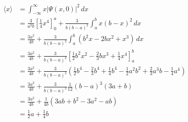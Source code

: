 \documentclass{article}
\begin{document}
\begin{enumerate}
        \begin{align*}
          \langle x \rangle & = \int_{-\infty}^\infty x |\Psi(x, 0)|^2 \,d x                                                                                                                             \\
                            & = \frac{3}{a^2 b} \left[ \frac{1}{4} x^4 \right]_0^a + \frac{3}{b (b - a)^2} \int_a^b x (b - x)^2 \,d x                                                                    \\
                            & = \frac{3 a^2}{4 b} + \frac{3}{b (b - a)^2} \int_a^b (b^2 x - 2 b x^2 + x^3) \,d x                                                                                         \\
                            & = \frac{3 a^2}{4 b} + \frac{3}{b (b - a)^2} \left[ \frac{1}{2} b^2 x^2 - \frac{2}{3} b x^3 + \frac{1}{4} x^4 \right]_a^b                                                   \\
                            & = \frac{3 a^2}{4 b} + \frac{3}{b (b - a)^2} \left( \frac{1}{2} b^4 - \frac{2}{3} b^4 + \frac{1}{4} b^4 - \frac{1}{2} a^2 b^2 + \frac{2}{3} a^3 b - \frac{1}{4} a^4 \right) \\
                            & = \frac{3 a^2}{4 b} + \frac{3}{b (b - a)^2} \frac{1}{12} (b - a)^3 (3 a + b)                                                                                               \\
                            & = \frac{3 a^2}{4 b} + \frac{1}{4 b} (3 a b + b^2 - 3 a^2 - a b)                                                                                                            \\
                            & = \frac{1}{2} a + \frac{1}{4} b
        \end{align*}
\end{enumerate}

\subsection{}
\end{document}
